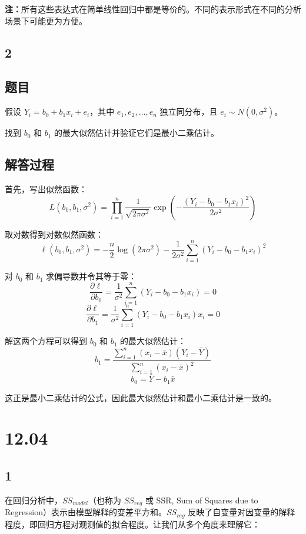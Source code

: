 \documentclass[UTF8]{report}
\theoremstyle{MyLineTheoremStyle} %
\theoremstyle{MyBlockTheoremStyle} %
\theoremstyle{MySubsubsectionStyle} %
\begin{document}
    \textbf{注：}所有这些表达式在简单线性回归中都是等价的。不同的表示形式在不同的分析场景下可能更为方便。



\subsection{2}

\subsection*{题目}
假设 $Y_i = b_0 + b_1 x_i + e_i$，其中 $e_1, e_2, \ldots, e_n$ 独立同分布，且 $e_i \sim N(0, \sigma^2)$。

找到 $b_0$ 和 $b_1$ 的最大似然估计并验证它们是最小二乘估计。

\subsection*{解答过程}

首先，写出似然函数：
\[
L(b_0, b_1, \sigma^2) = \prod_{i=1}^n \frac{1}{\sqrt{2\pi\sigma^2}} \exp\left(-\frac{(Y_i - b_0 - b_1 x_i)^2}{2\sigma^2}\right)
\]

取对数得到对数似然函数：
\[
\ell(b_0, b_1, \sigma^2) = -\frac{n}{2} \log(2\pi\sigma^2) - \frac{1}{2\sigma^2} \sum_{i=1}^n (Y_i - b_0 - b_1 x_i)^2
\]

对 $b_0$ 和 $b_1$ 求偏导数并令其等于零：
\[
\frac{\partial \ell}{\partial b_0} = \frac{1}{\sigma^2} \sum_{i=1}^n (Y_i - b_0 - b_1 x_i) = 0
\]
\[
\frac{\partial \ell}{\partial b_1} = \frac{1}{\sigma^2} \sum_{i=1}^n (Y_i - b_0 - b_1 x_i)x_i = 0
\]

解这两个方程可以得到 $b_0$ 和 $b_1$ 的最大似然估计：
\[
b_1 = \frac{\sum_{i=1}^n (x_i - \bar{x})(Y_i - \bar{Y})}{\sum_{i=1}^n (x_i - \bar{x})^2}
\]
\[
b_0 = \bar{Y} - b_1 \bar{x}
\]

这正是最小二乘估计的公式，因此最大似然估计和最小二乘估计是一致的。




\section{12.04}

\subsection{1}


    在回归分析中，$SS_{model}$（也称为 $SS_{reg}$ 或 SSR, Sum of Squares due to Regression）表示由模型解释的变差平方和。$SS_{reg}$ 反映了自变量对因变量的解释程度，即回归方程对观测值的拟合程度。让我们从多个角度来理解它：
    
\end{document}
